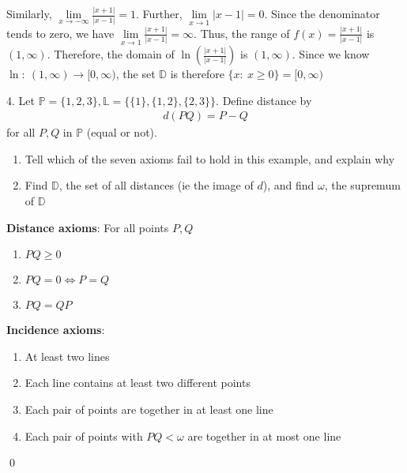 \documentclass{report}
\begin{document}
    Similarly, $\lim\limits_{x \to -\infty}{\frac{\left\lvert x+1 \right\rvert}{\left\lvert x-1 \right\rvert}} =1 $. Further, $\lim\limits_{x \to 1}{\left\lvert x-1 \right\rvert} = 0$. Since the denominator tends to zero, we have $\lim\limits_{x \to 1}{\frac{\left\lvert x+1 \right\rvert}{\left\lvert x-1 \right\rvert}} = \infty$. Thus, the range of $f(x) = \frac{\left\lvert x+1 \right\rvert}{\left\lvert x-1 \right\rvert} $ is $(1,\infty) $. Therefore, the domain of $\ln{\left(\frac{\left\lvert x+1 \right\rvert}{\left\lvert x-1 \right\rvert}\right)} $ is $(1,\infty)$. Since we know $\ln:\ (1,\infty) \to [0,\infty)$, the set $\mathbb{D}$ is therefore $\{x:\ x \geq 0\} = [0,\infty)$

    \bigbreak \noindent 
    \begin{mdframed}
        4. Let $\mathbb{P} = \{1,2,3\}, \mathbb{L} = \{\{1\}, \{1,2\}, \{2,3\}\}$. Define distance by 
        \begin{align*}
            d(PQ) = P - Q
        \end{align*}
        for all $P,Q$ in $\mathbb{P}$ (equal or not).
        \begin{enumerate}[label=(\alph*)]
            \item Tell which of the seven axioms fail to hold in this example, and explain why
            \item Find $\mathbb{D}$, the set of all distances (ie the image of $d$), and find $\omega$, the supremum of $\mathbb{D}$
        \end{enumerate}
    \end{mdframed}
    \bigbreak \noindent 
    \begin{remark}
        \textbf{Distance axioms}: For all points $P,Q$
        \begin{enumerate}
            \item $PQ \geq 0 $
            \item $PQ = 0 \iff P = Q $
            \item $PQ = QP $
        \end{enumerate}
        \textbf{Incidence axioms}:
        \begin{enumerate}
            \item At least two lines
            \item Each line contains at least two different points
            \item Each pair of points are together in at least one line
            \item Each pair of points with $PQ < \omega$ are together in at most one line
        \end{enumerate}
       \qed 
    \end{remark}
\end{document}
